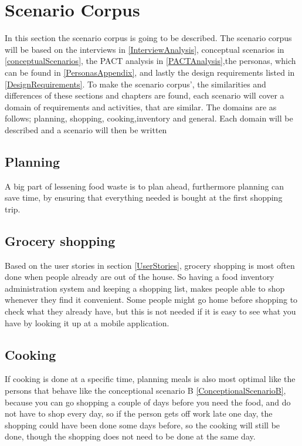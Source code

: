\section{Scenario Corpus} \label{ScenarioCorpus}

In this section the scenario corpus is going to be described. The scenario corpus will be based on the interviews in \cref{InterviewAnalysis}, conceptual scenarios in \cref{conceptualScenarios}, the PACT analysis in \cref{PACTAnalysis},the personas, which can be found in \cref{PersonasAppendix}, and lastly the design requirements listed in \cref{DesignRequirements}. To make the scenario corpus', the similarities and differences of these sections and chapters are found, each scenario will cover a domain of requirements and activities, that are similar. The domains are as follows; planning, shopping, cooking,inventory and general. Each domain will be described and a scenario will then be written

\subsection{Planning}
A big part of lessening food waste is to plan ahead, furthermore planning can save time, by ensuring that everything needed is bought at the first shopping trip. 

\subsection{Grocery shopping}

Based on the user stories in section \ref{UserStories}, grocery shopping is most often done when people already are out of the house. So having a food inventory administration system and keeping a shopping list, makes people able to shop whenever they find it convenient. Some people might go home before shopping to check what they already have, but this is not needed if it is easy to see what you have by looking it up at a mobile application.

\subsection{Cooking}

If cooking is done at a specific time, planning meals is also most optimal like the persons that behave like the conceptional scenario B \ref{ConceptionalScenarioB}, because you can go shopping a couple of days before you need the food, and do not have to shop every day, so if the person gets off work late one day, the shopping could have been done some days before, so the cooking will still be done, though the shopping does not need to be done at the same day.


